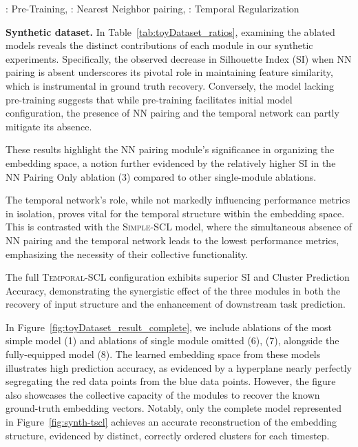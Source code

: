 \documentclass[pmlr,twocolumn,10pt]{jmlr} %
\newcommand{\bftab}{\fontseries{b}\selectfont}
\begin{document}
\begin{table}[ht!]
\vspace{.5ex}
{\scriptsize {\bftab{PT}}: Pre-Training, {\bftab{NN}}: Nearest Neighbor pairing, {\bftab{TR}}: Temporal Regularization\\}
\label{tab:ablation_results}
\end{table}

\textbf{Synthetic dataset.} 
In Table~\ref{tab:toyDataset_ratios}, examining the ablated models reveals the distinct contributions of each module in our synthetic experiments. Specifically, the observed decrease in Silhouette Index (SI) when NN pairing is absent underscores its pivotal role in maintaining feature similarity, which is instrumental in ground truth recovery. Conversely, the model lacking pre-training suggests that while pre-training facilitates initial model configuration, the presence of NN pairing and the temporal network can partly mitigate its absence.

These results highlight the NN pairing module's significance in organizing the embedding space, a notion further evidenced by the relatively higher SI in the NN Pairing Only ablation (3) compared to other single-module ablations.

The temporal network's role, while not markedly influencing performance metrics in isolation, proves vital for the temporal structure within the embedding space. This is contrasted with the \textsc{Simple-SCL} model, where the simultaneous absence of NN pairing and the temporal network leads to the lowest performance metrics, emphasizing the necessity of their collective functionality.

The full \textsc{Temporal-SCL} configuration exhibits superior SI and Cluster Prediction Accuracy, demonstrating the synergistic effect of the three modules in both the recovery of input structure and the enhancement of downstream task prediction.

In Figure~\ref{fig:toyDataset_result_complete}, we include ablations of the most simple model (1) and ablations of single module omitted (6), (7), alongside the fully-equipped model (8). The learned embedding space from these models illustrates high prediction accuracy, as evidenced by a hyperplane nearly perfectly segregating the red data points from the blue data points. However, the figure also showcases the collective capacity of the modules to recover the known ground-truth embedding vectors. Notably, only the complete model represented in Figure~\ref{fig:synth-tscl} achieves an accurate reconstruction of the embedding structure, evidenced by distinct, correctly ordered clusters for each timestep.
\end{document}
